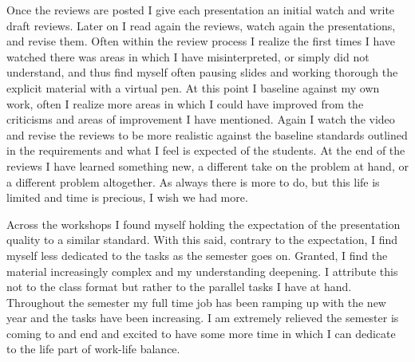 \documentclass[12pt]{article}
\begin{document}
Once the reviews are posted I give each presentation an initial watch and write draft reviews. Later on I read again the reviews, watch again the presentations, and revise them. Often within the review process I realize the first times I have watched there was areas in which I have misinterpreted, or simply did not understand, and thus find myself often pausing slides and working thorough the explicit material with a virtual pen. At this point I baseline against my own work, often I realize more areas in which I could have improved from the criticisms and areas of improvement I have mentioned. Again I watch the video and revise the reviews to be more realistic against the baseline standards outlined in the requirements and what I feel is expected of the students. At the end of the reviews I have learned something new, a different take on the problem at hand, or a different problem altogether. As always there is more to do, but this life is limited and time is precious, I wish we had more.

Across the workshops I found myself holding the expectation of the presentation quality to a similar standard. With this said, contrary to the expectation, I find myself less dedicated to the tasks as the semester goes on. Granted, I find the material increasingly complex and my understanding deepening. I attribute this not to the class format but rather to the parallel tasks I have at hand. Throughout the semester my full time job has been ramping up with the new year and the tasks have been increasing. I am extremely relieved the semester is coming to and end and excited to have some more time in which I can dedicate to the life part of work-life balance.
\end{document}
